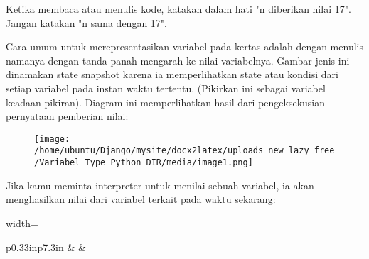 

\vspace{12pt}
\noindent 
Ketika membaca atau menulis kode, katakan dalam hati "n diberikan nilai 17". Jangan katakan "n sama dengan 17". \par
\vspace{12pt}
\noindent 
Cara umum untuk merepresentasikan variabel pada kertas adalah dengan menulis namanya dengan tanda panah mengarah ke nilai variabelnya. Gambar jenis ini dinamakan $  $state snapshot $  $karena ia memperlihatkan state atau kondisi dari setiap variabel pada instan waktu tertentu. (Pikirkan ini sebagai variabel keadaan pikiran). Diagram ini memperlihatkan hasil dari pengeksekusian pernyataan pemberian nilai: \par
\vspace{12pt}
\vspace{12pt}
\noindent 




\begin{figure}[H]
\begin{center}
\texttt{[image: /home/ubuntu/Django/mysite/docx2latex/uploads\_new\_lazy\_free/Variabel\_Type\_Python\_DIR/media/image1.png]}
\end{center}
\end{figure}




\vspace{12pt}
\vspace{12pt}
\noindent 
Jika kamu meminta interpreter untuk menilai sebuah variabel, ia akan menghasilkan nilai dari variabel terkait pada waktu sekarang: \par
\vspace{12pt}




\begin{table}[H]
\centering
\begin{adjustbox}{width=\textwidth}
\begin{tabular}{ p{0.33in}p{7.3in} }
\hhline{--}
 &  & \hline
\end{tabular}
\end{adjustbox}
\end{table}


